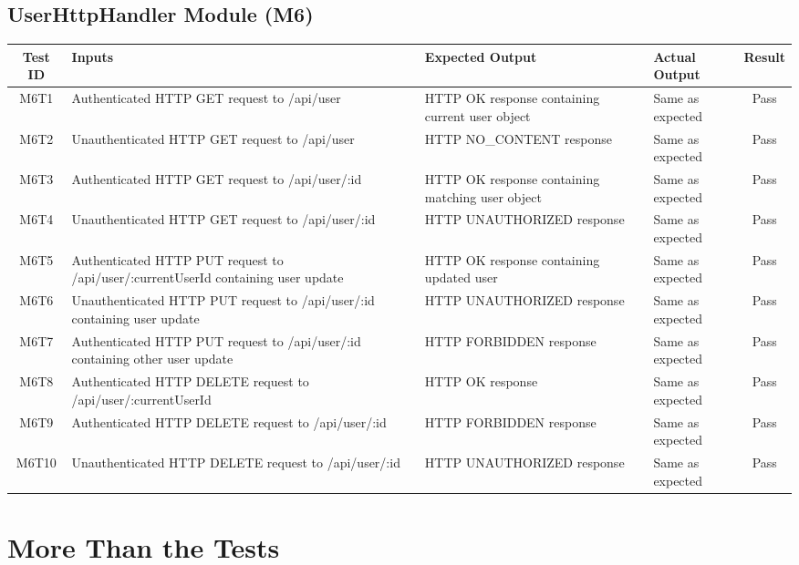 \documentclass[fullpage]{article}
\begin{document}
\subsection{UserHttpHandler Module (M6)}
\begin{table}[H]
\flushleft
\begin{tabular}{|c|p{4.5cm}|p{3.6cm}|p{3.6cm}|c|}
\hline
 \rowcolor{lightgray}
\textbf{Test ID} &\textbf{Inputs} &\textbf{Expected Output} &\textbf{Actual Output} &\textbf{Result}\\
\hline
M6T1 & Authenticated HTTP GET request to /api/user & HTTP OK response containing current user object & Same as expected & Pass \\
\hline
M6T2 & Unauthenticated HTTP GET request to /api/user & HTTP NO\_CONTENT response &Same as expected& Pass \\
\hline
M6T3 & Authenticated HTTP GET request to /api/user/:id & HTTP OK response containing matching user object & Same as expected & Pass \\
\hline
M6T4 & Unauthenticated HTTP GET request to /api/user/:id & HTTP UNAUTHORIZED response & Same as expected & Pass \\
\hline
M6T5 & Authenticated HTTP PUT request to /api/user/:currentUserId containing user update & HTTP OK response containing updated user & Same as expected & Pass \\
\hline
M6T6 & Unauthenticated HTTP PUT request to /api/user/:id containing user update & HTTP UNAUTHORIZED response & Same as expected & Pass \\
\hline
M6T7 & Authenticated HTTP PUT request to /api/user/:id containing other user update & HTTP FORBIDDEN response & Same as expected & Pass \\
\hline
M6T8 & Authenticated HTTP DELETE request to /api/user/:currentUserId & HTTP OK response & Same as expected & Pass \\
\hline
M6T9 & Authenticated HTTP DELETE request to /api/user/:id & HTTP FORBIDDEN response & Same as expected & Pass \\
\hline
M6T10 & Unauthenticated HTTP DELETE request to /api/user/:id & HTTP UNAUTHORIZED response & Same as expected & Pass \\
\hline
\end{tabular}
\end{table}

\section{More Than the Tests}
\end{document}
